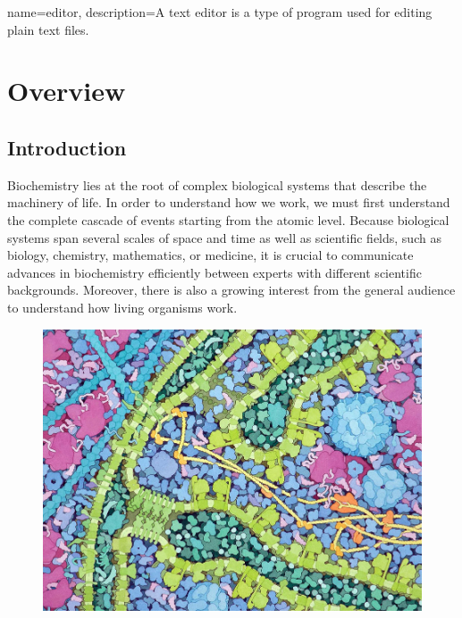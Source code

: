 
{
	name={editor},
	description={A text editor is a type of program used for editing plain text files.}
}

\chapter{Overview}

\section{Introduction}

Biochemistry lies at the root of complex biological systems that describe the machinery of life.
In order to understand how we work, we must first understand the complete cascade of events starting from the atomic level.
Because biological systems span several scales of space and time as well as scientific fields, such as biology, chemistry, mathematics, or medicine, it is crucial to communicate advances in biochemistry efficiently between experts with different scientific backgrounds.
Moreover, there is also a growing interest from the general audience to understand how living organisms work.

\begin{figure}
\centering
\includegraphics[width=0.95\linewidth]{graphics/Picture12}
\caption{}
\label{fig:david-s}
\end{figure}


